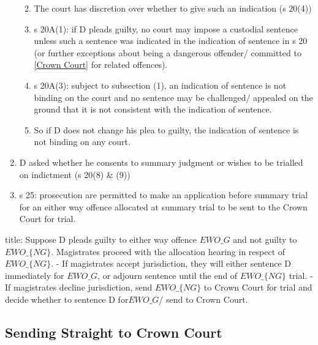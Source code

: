 \documentclass[
]{article}
\newenvironment{Shaded}{}{}
\newcommand{\NormalTok}[1]{#1}
\providecommand{\tightlist}{%
  \setlength{\itemsep}{0pt}\setlength{\parskip}{0pt}}
\begin{document}
\begin{enumerate}
  \begin{enumerate}
  \def\labelenumii{\arabic{enumii}.}
  \tightlist
  \item
    The court has discretion over whether to give such an indication (s
    20(4))
  \item
    s 20A(1): if D pleads guilty, no court may impose a custodial
    sentence unless such a sentence was indicated in the indication of
    sentence in s 20 (or further exceptions about being a dangerous
    offender/ committed to \href{no\%20financial\%20limit.}{{[}Crown
    Court{]}} for related offences).
  \item
    s 20A(3): subject to subsection (1), an indication of sentence is
    not binding on the court and no sentence may be challenged/ appealed
    on the ground that it is not consistent with the indication of
    sentence.
  \item
    So if D does not change his plea to guilty, the indication of
    sentence is not binding on any court.
  \end{enumerate}
\item
  D asked whether he consents to summary judgment or wishes to be
  trialled on indictment (s 20(8) \& (9))
\item
  s 25: prosecution are permitted to make an application before summary
  trial for an either way offence allocated at summary trial to be sent
  to the Crown Court for trial.
\end{enumerate}

\begin{Shaded}
\begin{Highlighting}[]
\NormalTok{title: Suppose D pleads guilty to either way offence $EWO\_G$ and not guilty to $EWO\_\{NG\}$. }
\NormalTok{Magistrates proceed with the allocation hearing in respect of $EWO\_\{NG\}$. }
\NormalTok{{-} If magistrates accept jurisdiction, they will either sentence D immediately for $EWO\_G$, or adjourn sentence until the end of $EWO\_\{NG\}$ trial. }
\NormalTok{{-} If magistrates decline jurisdiction, send $EWO\_\{NG\}$ to Crown Court for trial and decide whether to sentence D for$EWO\_G$/ send to Crown Court. }
\end{Highlighting}
\end{Shaded}

\hypertarget{sending-straight-to-crown-court}{%
\subsection{Sending Straight to Crown
Court}\label{sending-straight-to-crown-court}}
\end{document}
